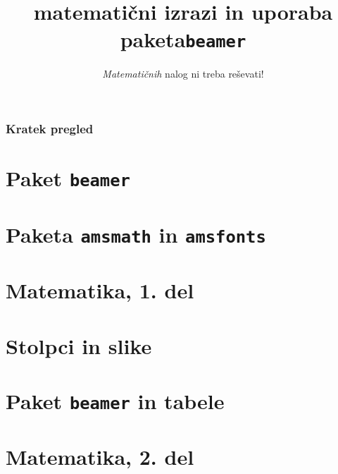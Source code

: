 \documentclass{beamer}
\title{matematični izrazi in uporaba paketa\texttt{beamer}}
\subtitle{\emph{Matematičnih} nalog ni treba reševati!}
\institute{Fakulteta za matematiko in fiziko}
\date{}
\begin{document}
\frame{\titlepage}
\begin{frame}
    \frametitle{Kratek pregled}
    \tableofcontents%
\end{frame}

\section{Paket \texttt{beamer}}

\section{Paketa \texttt{amsmath} in \texttt{amsfonts}}

\section[Matematika, 1. del\\\large{Analiza, logika, množice}]{Matematika, 1. del}

\section{Stolpci in slike}

\section{Paket \texttt{beamer} in tabele}

\section[Matematika, 2. del\\\large{Zaporedja, algebra, grupe}]{Matematika, 2. del}
\end{document}
